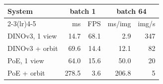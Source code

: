 \begin{tabular}{@{}l rr rr@{}}
\toprule
System & \multicolumn{2}{c}{batch 1} & \multicolumn{2}{c}{batch 64} \\
\cmidrule(lr){2-3}\cmidrule(lr){4-5} & ms & FPS & ms/img & img/s \\
\midrule
DINOv3, 1 view & 14.7 & 68.1 & 2.9 & 347 \\
DINOv3 + orbit & 69.6 & 14.4 & 12.1 & 82 \\
PoE, 1 view & 64.0 & 15.6 & 50.0 & 20 \\
PoE + orbit & 278.5 & 3.6 & 206.8 & 5 \\
\bottomrule
\end{tabular}